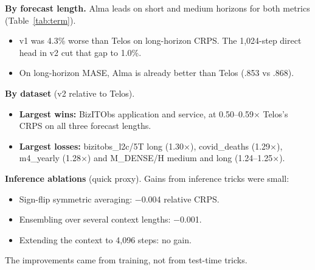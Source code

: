 \documentclass[10pt,twocolumn]{extarticle}
\begin{document}
\textbf{By forecast length.} Alma leads on short and medium horizons for both
metrics (Table~\ref{tab:term}).
\begin{itemize}
\item v1 was 4.3\% worse than Telos on long-horizon CRPS. The 1{,}024-step direct
head in v2 cut that gap to 1.0\%.
\item On long-horizon MASE, Alma is already better than Telos (.853 vs .868).
\end{itemize}

\textbf{By dataset} (v2 relative to Telos).
\begin{itemize}
\item \textbf{Largest wins:} BizITObs application and service, at 0.50--0.59$\times$
Telos's CRPS on all three forecast lengths.
\item \textbf{Largest losses:} bizitobs\_l2c/5T long (1.30$\times$), covid\_deaths
(1.29$\times$), m4\_yearly (1.28$\times$) and M\_DENSE/H medium and long
(1.24--1.25$\times$).
\end{itemize}

\textbf{Inference ablations} (quick proxy). Gains from inference tricks were small:
\begin{itemize}
\item Sign-flip symmetric averaging: $-$0.004 relative CRPS.
\item Ensembling over several context lengths: $-$0.001.
\item Extending the context to 4{,}096 steps: no gain.
\end{itemize}
The improvements came from training, not from test-time tricks.
\end{document}
